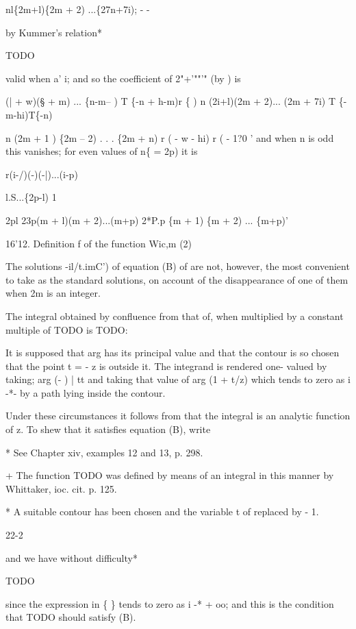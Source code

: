 nl\{2m+l)\{2m + 2) ...\{27n+7i); - -

by Kummer's relation*

TODO

valid when a' i; and so the coefficient of 2"+'""'" (by 
) is

(| + w)(§ + m) ... \{n-m-- ) T \{-n + h-m)r \{ ) n (2i+l)(2m +
2)... (2m + 7i) T \{-m-hi)T\{-n)

n (2m + 1 ) \{2m -- 2) . . . \{2m + n) r ( - w - hi) r ( - 1?0 '
and when n is odd this vanishes; for even values of n\{ = 2p) it is

r(i-/)(-)(-|)...(i-p)

l.S...\{2p-l) 1

2pl 23p(m + l)(m + 2)...(m+p) 2*P.p \{m + 1) \{m + 2) ... \{m+p)'

16'12. Definition f of the function Wic,m (2) 

The solutions -il/t.imC') of equation (B) of are not,
however, the most convenient to take as the standard solutions, on
account of the disappearance of one of them when 2m is an integer.

The integral obtained by confluence from that of, when
multiplied by a constant multiple of TODO is TODO:

It is supposed that arg has its principal value and that the contour
is so chosen that the point t = - z is outside it. The integrand is
rendered one- valued by taking; arg (- ) |  tt and taking that
value of arg (1 + t/z) which tends to zero as i -*- by a path lying
inside the contour.

Under these circumstances it follows from that the integral is
an analytic function of z. To shew that it satisfies equation (B),
write

* See Chapter xiv, examples 12 and 13, p. 298.

+ The function TODO was defined by means of an integral in this manner
by Whittaker, ioc. cit. p. 125.

* A suitable contour has been chosen and the variable t of
replaced by - 1.

22-2

%
%

and we have without difficulty*

TODO

since the expression in \{ \} tends to zero as i -* + oo; and this is
the condition that TODO should satisfy (B).


